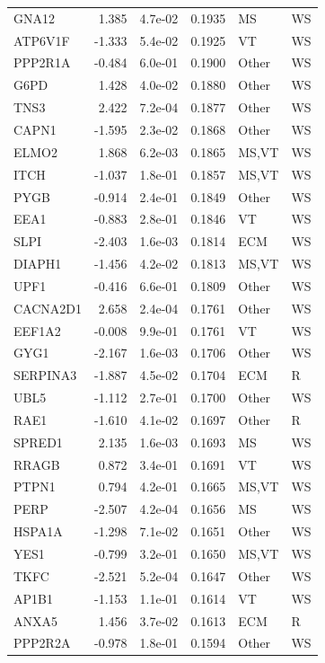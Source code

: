 \begin{table}[ht]
\begin{tabular}{lrlrll}
  GNA12 & 1.385 & 4.7e-02 & 0.1935 & MS & WS \\ 
  ATP6V1F & -1.333 & 5.4e-02 & 0.1925 & VT & WS \\ 
  PPP2R1A & -0.484 & 6.0e-01 & 0.1900 & Other & WS \\ 
  G6PD & 1.428 & 4.0e-02 & 0.1880 & Other & WS \\ 
  TNS3 & 2.422 & 7.2e-04 & 0.1877 & Other & WS \\ 
  CAPN1 & -1.595 & 2.3e-02 & 0.1868 & Other & WS \\ 
  ELMO2 & 1.868 & 6.2e-03 & 0.1865 & MS,VT & WS \\ 
  ITCH & -1.037 & 1.8e-01 & 0.1857 & MS,VT & WS \\ 
  PYGB & -0.914 & 2.4e-01 & 0.1849 & Other & WS \\ 
  EEA1 & -0.883 & 2.8e-01 & 0.1846 & VT & WS \\ 
  SLPI & -2.403 & 1.6e-03 & 0.1814 & ECM & WS \\ 
  DIAPH1 & -1.456 & 4.2e-02 & 0.1813 & MS,VT & WS \\ 
  UPF1 & -0.416 & 6.6e-01 & 0.1809 & Other & WS \\ 
  CACNA2D1 & 2.658 & 2.4e-04 & 0.1761 & Other & WS \\ 
  EEF1A2 & -0.008 & 9.9e-01 & 0.1761 & VT & WS \\ 
  GYG1 & -2.167 & 1.6e-03 & 0.1706 & Other & WS \\ 
  SERPINA3 & -1.887 & 4.5e-02 & 0.1704 & ECM & R \\ 
  UBL5 & -1.112 & 2.7e-01 & 0.1700 & Other & WS \\ 
  RAE1 & -1.610 & 4.1e-02 & 0.1697 & Other & R \\ 
  SPRED1 & 2.135 & 1.6e-03 & 0.1693 & MS & WS \\ 
  RRAGB & 0.872 & 3.4e-01 & 0.1691 & VT & WS \\ 
  PTPN1 & 0.794 & 4.2e-01 & 0.1665 & MS,VT & WS \\ 
  PERP & -2.507 & 4.2e-04 & 0.1656 & MS & WS \\ 
  HSPA1A & -1.298 & 7.1e-02 & 0.1651 & Other & WS \\ 
  YES1 & -0.799 & 3.2e-01 & 0.1650 & MS,VT & WS \\ 
  TKFC & -2.521 & 5.2e-04 & 0.1647 & Other & WS \\ 
  AP1B1 & -1.153 & 1.1e-01 & 0.1614 & VT & WS \\ 
  ANXA5 & 1.456 & 3.7e-02 & 0.1613 & ECM & R \\ 
  PPP2R2A & -0.978 & 1.8e-01 & 0.1594 & Other & WS \\ 

\end{tabular}
\end{table}
